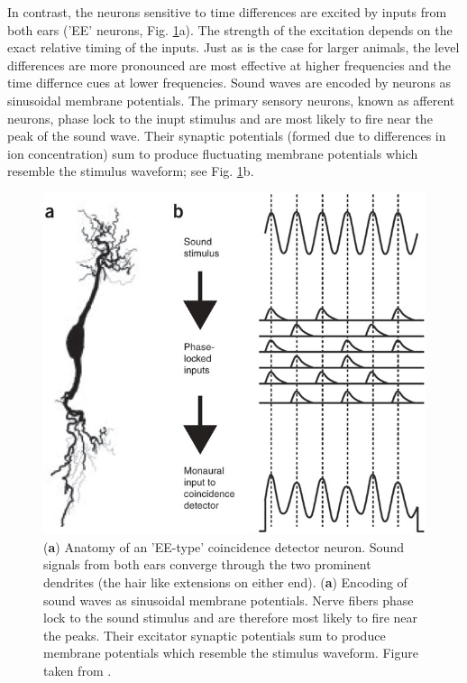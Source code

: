 In contrast, the neurons sensitive to time differences are excited by inputs from both ears ('EE' neurons, Fig. \ref{EEtypedetector}a). The strength of the
excitation depends on the exact relative timing of the inputs. Just as is the case for larger animals, the level
differences are more pronounced are most effective at higher frequencies and the time differnce cues at lower frequencies. Sound waves are encoded
by neurons as sinusoidal membrane potentials. The primary sensory neurons, known as afferent neurons, phase lock to the inupt
stimulus and are most likely to fire near the peak of the sound wave. Their synaptic potentials (formed due to differences
in ion concentration) sum to produce fluctuating membrane potentials which resemble the stimulus waveform; see Fig. \ref{EEtypedetector}b. 
\begin{figure}[ht!]
 \centering
 \includegraphics[width=0.7\linewidth]{Diagrams/EEtypedetector.jpg}
 \caption[EE-type coincidence detector and encoding of sound waves as membrane potentials.]{(\textbf{a}) Anatomy of an 'EE-type'
 coincidence detector neuron. Sound signals from both ears converge through the two prominent dendrites (the hair like extensions
 on either end). (\textbf{a}) Encoding of sound waves as sinusoidal membrane potentials. Nerve fibers phase lock to the sound stimulus and
 are therefore most likely to fire near the peaks. Their excitator synaptic potentials sum to produce membrane potentials which resemble the
 stimulus waveform. Figure taken from \cite{schnuppcarr}.}
 \label{EEtypedetector}
\end{figure}

